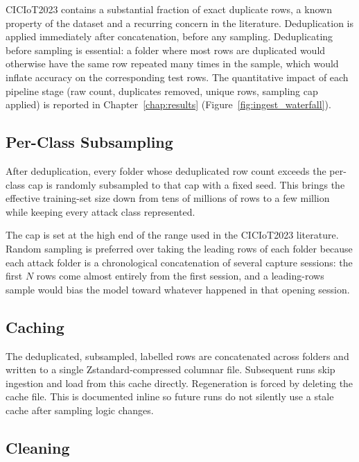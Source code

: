 \par CICIoT2023 contains a substantial fraction of exact duplicate rows, a known property of the dataset and a recurring concern in the literature. Deduplication is applied immediately after concatenation, before any sampling. Deduplicating before sampling is essential: a folder where most rows are duplicated would otherwise have the same row repeated many times in the sample, which would inflate accuracy on the corresponding test rows. The quantitative impact of each pipeline stage (raw count, duplicates removed, unique rows, sampling cap applied) is reported in Chapter~\ref{chap:results} (Figure~\ref{fig:ingest_waterfall}).

\subsection{Per-Class Subsampling}
\label{subsec:subsampling}

\par After deduplication, every folder whose deduplicated row count exceeds the per-class cap is randomly subsampled to that cap with a fixed seed. This brings the effective training-set size down from tens of millions of rows to a few million while keeping every attack class represented.

\par The cap is set at the high end of the range used in the CICIoT2023 literature. Random sampling is preferred over taking the leading rows of each folder because each attack folder is a chronological concatenation of several capture sessions: the first $N$ rows come almost entirely from the first session, and a leading-rows sample would bias the model toward whatever happened in that opening session.

\subsection{Caching}
\label{subsec:caching}

\par The deduplicated, subsampled, labelled rows are concatenated across folders and written to a single Zstandard-compressed columnar file. Subsequent runs skip ingestion and load from this cache directly. Regeneration is forced by deleting the cache file. This is documented inline so future runs do not silently use a stale cache after sampling logic changes.

\subsection{Cleaning}
\label{subsec:cleaning}

